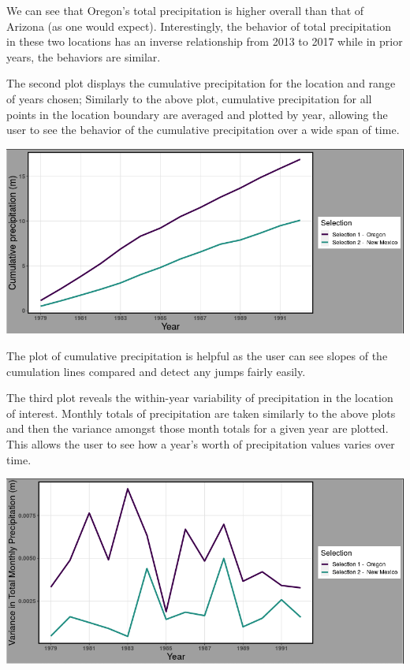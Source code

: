 \documentclass[10pt,letterpaper]{article}
\begin{document}
We can see that Oregon’s total precipitation is higher overall than that of Arizona (as one would expect). Interestingly, the behavior of total precipitation in these two locations has an inverse relationship from 2013 to 2017 while in prior years, the behaviors are similar.

The second plot displays the cumulative precipitation for the location and range of years chosen; Similarly to the above plot, cumulative precipitation for all points in the location boundary are averaged and plotted by year, allowing the user to see the behavior of the cumulative precipitation over a wide span of time.


\begin{center}
  \includegraphics[width = .8\textwidth]{graphics/cumulative_year}
\end{center}

The plot of cumulative precipitation is helpful as the user can see slopes of the cumulation lines compared and detect any jumps fairly easily.

The third plot reveals the within-year variability of precipitation in the location of interest. Monthly totals of precipitation are taken similarly to the above plots and then the variance amongst those month totals for a given year are plotted. This allows the user to see how a year’s worth of precipitation values varies over time.


\begin{center}
  \includegraphics[width = .8\textwidth]{graphics/variance}
\end{center}
\end{document}
